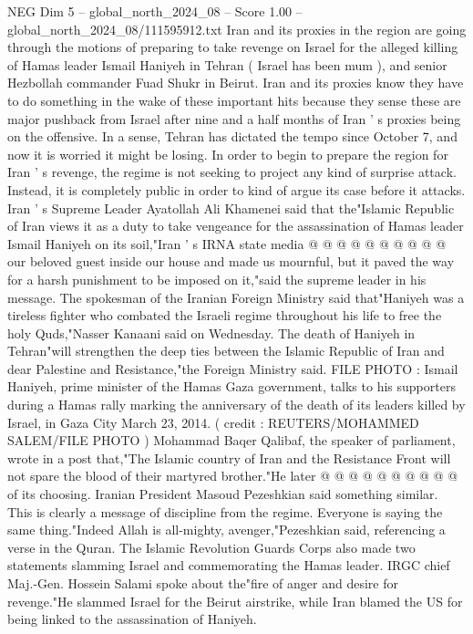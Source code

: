 \begin{textsample}{NEG Dim 5 – global\_north\_2024\_08 – Score 1.00 – global\_north\_2024\_08/111595912.txt}  \label{ex:f5_neg_075}
Iran and its proxies in the region are going through the motions of preparing to take revenge on Israel for the alleged killing of Hamas leader Ismail Haniyeh in Tehran ( Israel has been mum ), and senior Hezbollah commander Fuad Shukr in Beirut.
Iran and its proxies know they have to do something in the wake of these important hits because they sense these are major pushback from Israel after nine and a half months of Iran ' s proxies being on the offensive.
In a sense, Tehran has dictated the tempo since October 7, and now it is worried it might be losing.
In order to begin to prepare the region for Iran ' s revenge, the regime is not seeking to project any kind of surprise attack.
Instead, it is completely public in order to kind of argue its case before it attacks.
Iran ' s Supreme Leader Ayatollah Ali Khamenei said that the"Islamic Republic of Iran views it as a duty to take vengeance for the assassination of Hamas leader Ismail Haniyeh on its soil,"Iran ' s IRNA state media @ @ @ @ @ @ @ @ @ @ our beloved guest inside our house and made us mournful, but it paved the way for a harsh punishment to be imposed on it,"said the supreme leader in his message.
The spokesman of the Iranian Foreign Ministry said that"Haniyeh was a tireless fighter who combated the Israeli regime throughout his life to free the holy Quds,"Nasser Kanaani said on Wednesday.
The death of Haniyeh in Tehran"will strengthen the deep ties between the Islamic Republic of Iran and dear Palestine and Resistance,"the Foreign Ministry said.
FILE PHOTO : Ismail Haniyeh, prime minister of the Hamas Gaza government, talks to his supporters during a Hamas rally marking the anniversary of the death of its leaders killed by Israel, in Gaza City March 23, 2014. ( credit : REUTERS/MOHAMMED SALEM/FILE PHOTO ) Mohammad Baqer Qalibaf, the speaker of parliament, wrote in a post that,"The Islamic country of Iran and the Resistance Front will not spare the blood of their martyred brother."He later @ @ @ @ @ @ @ @ @ @ of its choosing.
Iranian President Masoud Pezeshkian said something similar.
This is clearly a message of discipline from the regime.
Everyone is saying the same thing."Indeed Allah is all-mighty, avenger,"Pezeshkian said, referencing a verse in the Quran.
The Islamic Revolution Guards Corps also made two statements slamming Israel and commemorating the Hamas leader.
IRGC chief Maj.-Gen.
Hossein Salami spoke about the"fire of anger and desire for revenge."He slammed Israel for the Beirut airstrike, while Iran blamed the US for being linked to the assassination of Haniyeh.

\end{textsample}
